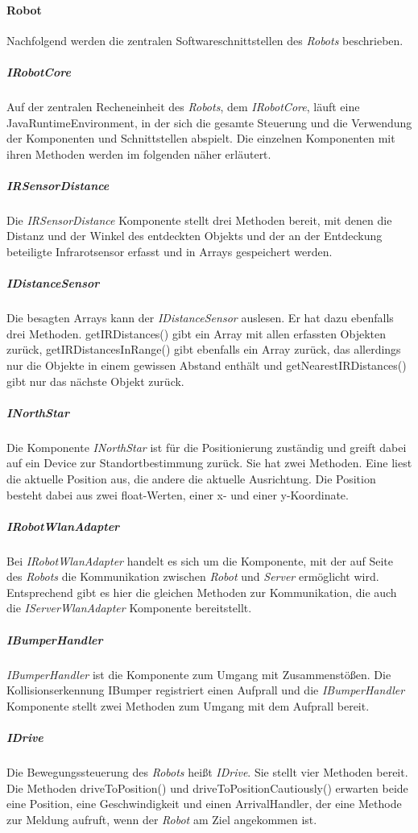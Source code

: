     \paragraph{Robot}\label{robot}
    		Nachfolgend werden die zentralen Softwareschnittstellen des \emph{Robots} beschrieben.
    	\subparagraph{IRobotCore}\label{irobotcore}
    		Auf der zentralen Recheneinheit des \emph{Robots}, dem \emph{IRobotCore}, läuft eine JavaRuntimeEnvironment, in der sich die gesamte Steuerung und die Verwendung der Komponenten und Schnittstellen abspielt. 
    		Die einzelnen Komponenten mit ihren Methoden werden im folgenden näher erläutert.
    	\subparagraph{IRSensorDistance}\label{irsensordistance}
    		Die \emph{IRSensorDistance} Komponente stellt drei Methoden bereit, mit denen die Distanz und der Winkel des entdeckten Objekts und der an der Entdeckung beteiligte Infrarotsensor erfasst und in Arrays gespeichert werden.
    	\subparagraph{IDistanceSensor}\label{idistancesensor}
    		Die besagten Arrays kann der \emph{IDistanceSensor} auslesen. 
    		Er hat dazu ebenfalls drei Methoden. getIRDistances() gibt ein Array mit allen erfassten Objekten zurück, getIRDistancesInRange() gibt ebenfalls ein Array zurück, das allerdings nur die Objekte in einem gewissen Abstand enthält und getNearestIRDistances() gibt nur das nächste Objekt zurück.
    	\subparagraph{INorthStar}\label{inorthstar}
    		Die Komponente \emph{INorthStar} ist für die Positionierung zuständig und greift dabei auf ein Device zur Standortbestimmung zurück. 
    		Sie hat zwei Methoden. 
    		Eine liest die aktuelle Position aus, die andere die aktuelle Ausrichtung. 
    		Die Position besteht dabei aus zwei float-Werten, einer x- und einer y-Koordinate.
    	\subparagraph{IRobotWlanAdapter}\label{irobotwlanadapter}
    		Bei \emph{IRobotWlanAdapter} handelt es sich um die Komponente, mit der auf Seite des \emph{Robots} die Kommunikation zwischen \emph{Robot} und \emph{Server} ermöglicht wird. 
    		Entsprechend gibt es hier die gleichen Methoden zur Kommunikation, die auch die \emph{IServerWlanAdapter} Komponente bereitstellt.
    	\subparagraph{IBumperHandler}\label{ibumperhandler}
    		\emph{IBumperHandler} ist die Komponente zum Umgang mit Zusammenstößen. 
    		Die Kollisionserkennung IBumper registriert einen Aufprall und die \emph{IBumperHandler} Komponente stellt zwei Methoden zum Umgang mit dem Aufprall bereit.
    	\subparagraph{IDrive}\label{idrive}
    		Die Bewegungssteuerung des \emph{Robots} heißt \emph{IDrive}. 
    		Sie stellt vier Methoden bereit. 
    		Die Methoden driveToPosition() und driveToPositionCautiously() erwarten beide eine Position, eine Geschwindigkeit und einen ArrivalHandler, der eine Methode zur Meldung aufruft, wenn der \emph{Robot} am Ziel angekommen ist. 
